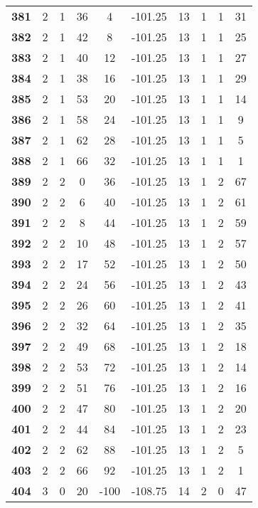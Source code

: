 \documentclass{article}%
\begin{document}
\begin{longtable}{cccccccccc}
        \textbf{381} & 2 & 1 & 36 & 4 & -101.25 & 13 & 1 & 1 & 31 \\ 
        \textbf{382} & 2 & 1 & 42 & 8 & -101.25 & 13 & 1 & 1 & 25 \\ 
        \textbf{383} & 2 & 1 & 40 & 12 & -101.25 & 13 & 1 & 1 & 27 \\ 
        \textbf{384} & 2 & 1 & 38 & 16 & -101.25 & 13 & 1 & 1 & 29 \\ 
        \textbf{385} & 2 & 1 & 53 & 20 & -101.25 & 13 & 1 & 1 & 14 \\ 
        \textbf{386} & 2 & 1 & 58 & 24 & -101.25 & 13 & 1 & 1 & 9 \\ 
        \textbf{387} & 2 & 1 & 62 & 28 & -101.25 & 13 & 1 & 1 & 5 \\ 
        \textbf{388} & 2 & 1 & 66 & 32 & -101.25 & 13 & 1 & 1 & 1 \\ 
        \textbf{389} & 2 & 2 & 0 & 36 & -101.25 & 13 & 1 & 2 & 67 \\ 
        \textbf{390} & 2 & 2 & 6 & 40 & -101.25 & 13 & 1 & 2 & 61 \\ 
        \textbf{391} & 2 & 2 & 8 & 44 & -101.25 & 13 & 1 & 2 & 59 \\ 
        \textbf{392} & 2 & 2 & 10 & 48 & -101.25 & 13 & 1 & 2 & 57 \\ 
        \textbf{393} & 2 & 2 & 17 & 52 & -101.25 & 13 & 1 & 2 & 50 \\ 
        \textbf{394} & 2 & 2 & 24 & 56 & -101.25 & 13 & 1 & 2 & 43 \\ 
        \textbf{395} & 2 & 2 & 26 & 60 & -101.25 & 13 & 1 & 2 & 41 \\ 
        \textbf{396} & 2 & 2 & 32 & 64 & -101.25 & 13 & 1 & 2 & 35 \\ 
        \textbf{397} & 2 & 2 & 49 & 68 & -101.25 & 13 & 1 & 2 & 18 \\ 
        \textbf{398} & 2 & 2 & 53 & 72 & -101.25 & 13 & 1 & 2 & 14 \\ 
        \textbf{399} & 2 & 2 & 51 & 76 & -101.25 & 13 & 1 & 2 & 16 \\ 
        \textbf{400} & 2 & 2 & 47 & 80 & -101.25 & 13 & 1 & 2 & 20 \\ 
        \textbf{401} & 2 & 2 & 44 & 84 & -101.25 & 13 & 1 & 2 & 23 \\ 
        \textbf{402} & 2 & 2 & 62 & 88 & -101.25 & 13 & 1 & 2 & 5 \\ 
        \textbf{403} & 2 & 2 & 66 & 92 & -101.25 & 13 & 1 & 2 & 1 \\ 
        \textbf{404} & 3 & 0 & 20 & -100 & -108.75 & 14 & 2 & 0 & 47 \\ 

\end{longtable}
\end{document}
